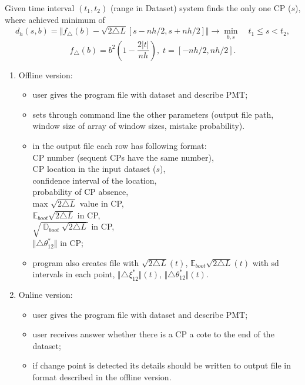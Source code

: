 \documentclass[a4paper,12pt]{report} %
\theoremstyle{definition}
\newcommand{\Var}{\ensuremath{\mathop{\mathbb{D}}}\nolimits}
\newcommand{\Exp}{\ensuremath{\mathrm{{\mathbb E}}}}
\begin{document}
\begin{enumerate}
Given time interval $(t_1, t_2)$ (range in Dataset) system finds the only one CP ($s$), where achieved minimum of 
\[
d_h(s,b) = \Vert f_{\triangle}(b) -  \sqrt{2 \triangle L}[s - nh/2, s+nh/2] \Vert  \to  \min_{b,s}
\quad t_1 \leq  s < t_2,
\] 
\[
f_{\triangle}(b) =  b^2 \left(1 - \frac{2 |t|}{nh} \right), \;  t = [-nh/2, nh/2].
\]
\begin{enumerate}
\item Offline version: 
\begin{itemize}
\item user gives the program file with dataset and describe PMT;
\item sets through command line the other parameters (output file path,  window size of array of window sizes, mistake probability).
\item in the output file each row has following format: \\
CP number (sequent CPs have the same number), \\ 
CP location in the input dataset ($s$), \\
confidence interval of the location,  \\
probability of CP absence, \\
max $\sqrt{2 \triangle L}$ value in CP,  \\
$\Exp_{boot} \sqrt{2 \triangle L}$  in CP,  \\
$\sqrt{ \Var_{boot} \sqrt{2 \triangle L}}$  in CP,   \\
$\Vert \triangle \theta_{12}^{*} \Vert $  in CP;
\item program also creates file with $\sqrt{2 \triangle L}(t)$, $\Exp_{boot} \sqrt{2 \triangle L}(t)$ with  sd intervals in each point, $\Vert \triangle \xi_{12}^{*} \Vert(t)$, $\Vert \triangle \theta_{12}^{*} \Vert(t)$.
\end{itemize}

\item Online version:
\begin{itemize}
\item user gives the program file with dataset and describe PMT;
\item user receives answer whether there is a CP a cote to the end of the dataset;
\item if change point is detected its details should be written to output file in format described in the offline version.   
\end{itemize} 

\end{enumerate}


\end{enumerate}
\end{document}
